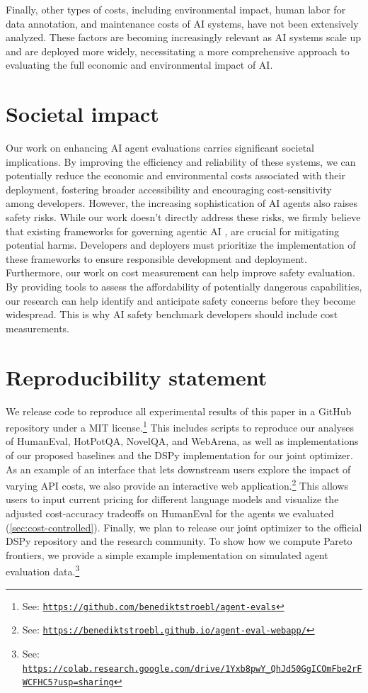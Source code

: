 \documentclass{article}
\begin{document}
Finally, other types of costs, including environmental impact, human labor for data annotation, and maintenance costs of AI systems, have not been extensively analyzed. These factors are becoming increasingly relevant as AI systems scale up and are deployed more widely, necessitating a more comprehensive approach to evaluating the full economic and environmental impact of AI.

\section{Societal impact}
\label{appendix:impact}

Our work on enhancing AI agent evaluations carries significant societal implications. By improving the efficiency and reliability of these systems, we can potentially reduce the economic and environmental costs associated with their deployment, fostering broader accessibility and encouraging cost-sensitivity among developers. However, the increasing sophistication of AI agents also raises safety risks. While our work doesn’t directly address these risks, we firmly believe that existing frameworks for governing agentic AI \citep{shavit_practices_2023}, are crucial for mitigating potential harms. Developers and deployers must prioritize the implementation of these frameworks to ensure responsible development and deployment. Furthermore, our work on cost measurement can help improve safety evaluation. By providing tools to assess the affordability of potentially dangerous capabilities, our research can help identify and anticipate safety concerns before they become widespread. This is why AI safety benchmark developers should include cost measurements.

\section{Reproducibility statement}
\label{appendix:reproc-statement}

We release code to reproduce all experimental results of this paper in a GitHub repository under a MIT license.\footnote{See: \texttt{\url{https://github.com/benediktstroebl/agent-evals}}} This includes scripts to reproduce our analyses of HumanEval, HotPotQA, NovelQA, and WebArena, as well as implementations of our proposed baselines and the DSPy implementation for our joint optimizer.
As an example of an interface that lets downstream users explore the impact of varying API costs, we also provide an interactive web application.\footnote{See: \texttt{\url{https://benediktstroebl.github.io/agent-eval-webapp/}}} This allows users to input current pricing for different language models and visualize the adjusted cost-accuracy tradeoffs on HumanEval for the agents we evaluated (\cref{sec:cost-controlled}). Finally, we plan to release our joint optimizer to the official DSPy repository and the research community.
To show how we compute Pareto frontiers, we provide a simple example implementation on simulated agent evaluation data.\footnote{See: \texttt{\url{https://colab.research.google.com/drive/1Yxb8pwY_QhJd50GgICOmFbe2rFWCFHC5?usp=sharing}}}
\end{document}
